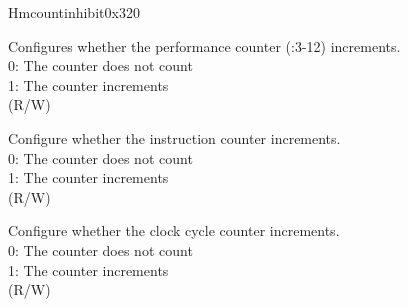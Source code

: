 \begin{register}{H}{mcountinhibit}{0x320}\label{regdesc:LPMCOUNTINHIBIT}
%
%
%
%
\regnewline%
\begin{regdesc}\begin{reglist}
\label{fielddesc:LPMCOUNTINHIBITHPM}\item [HPM] Configures whether the performance counter (:3-12) increments. \\
0: The counter does not count\\
1: The counter increments\\
(R/W)
\label{fielddesc:LPMCOUNTINHIBITIR}\item [IR] Configure whether the instruction counter increments. \\
0: The counter does not count\\
1: The counter increments\\
(R/W)
\label{fielddesc:LPMCOUNTINHIBITCY}\item [CY] Configure whether the clock cycle counter increments. \\
0: The counter does not count\\
1: The counter increments\\
(R/W)
\end{reglist}\end{regdesc}
\end{register}

